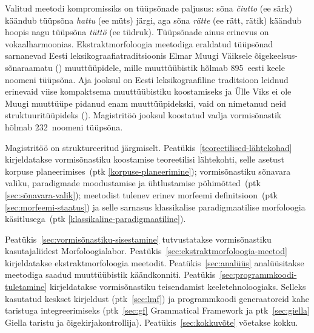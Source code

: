 \documentclass[12pt,a4paper]{article}
\newcommand{\vadja}[1]{\textit{#1}}
\begin{document}
Valitud meetodi kompromissiks on tüüpsõnade paljusus: sõna \vadja{čiutto} (ee särk) käändub tüüpsõna \vadja{hattu} (ee müts) järgi, aga sõna \vadja{rätte} (ee rätt, rätik) käändub hoopis nagu tüüpsõna \vadja{tüttö} (ee tüdruk). Tüüp\-sõnade ainus erinevus on vokaalharmoonias. Ekstrakt\-morfoloogia meetodiga eraldatud tüüpsõnad sarnanevad Eesti leksikograafia\-traditsioonis Elmar Muugi Väiksele õigekeelsus-sõnaraamatu (\citeyear{muuk_vaike_1933}) muuttüüpidele, mille muuttüübistik hõlmab 895~eesti keele noomeni tüüpsõna. Aja jooksul on Eesti leksikograafiline traditsioon leidnud erinevaid viise kompaktsema muuttüübistiku koostamiseks ja Ülle Viks ei ole Muugi muuttüüpe pidanud enam muuttüüpidekski, vaid on nimetanud neid struktuuri\-tüüpideks (\cite[282]{viks_verbide_1976}). Magistritöö jooksul koostatud vadja vormisõnastik hõlmab 232~noomeni tüüpsõna. %


Magistritöö on struktureeritud järgmiselt. 
Peatükis~\ref{teoreetilised-lähtekohad} kirjeldatakse vormisõnastiku koostamise teoreetilisi lähtekohti, selle asetust korpuse planeerimises~(ptk \ref{korpuse-planeerimine}); vormisõnastiku sõnavara valiku, paradigmade moodustamise ja ühtlustamise põhimõtted~(ptk \ref{sec:sõnavara-valik}); meetodist tulenev erinev morfeemi definitsioon~(ptk \ref{sec:morfeemi-staatus}) ja selle sarnasus klassikalise paradigmaatilise morfoloogia käsitlusega~(ptk \ref{klassikaline-paradigmaatiline}). %

Peatükis~\ref{sec:vormisõnastiku-sisestamine} tutvustatakse vormisõnastiku kasutajaliidest Morfoloogia\-labor. 
Peatükis~\ref{sec:ekstraktmorfoloogia-meetod} kirjeldatakse ekstraktmorfoloogia meetodit. 
Peatükis~\ref{sec:analüüs} analüüsitakse meetodiga saadud muuttüübistik käändkonniti. 
Peatükis~\ref{sec:programmkoodi-tuletamine} kirjeldatakse vormisõnastiku teisendamist keele\-tehnoloogiaks. Selleks kasutatud keskset kirjeldust (ptk~\ref{sec:lmf}) ja programm\-koodi generaatoreid kahe taristuga integreerimiseks (ptk~\ref{sec:gf} Grammatical Framework ja ptk~\ref{sec:giella} Giella taristu ja õigekirjakontrollija).
Peatükis~\ref{sec:kokkuvõte} võetakse kokku.
\end{document}
